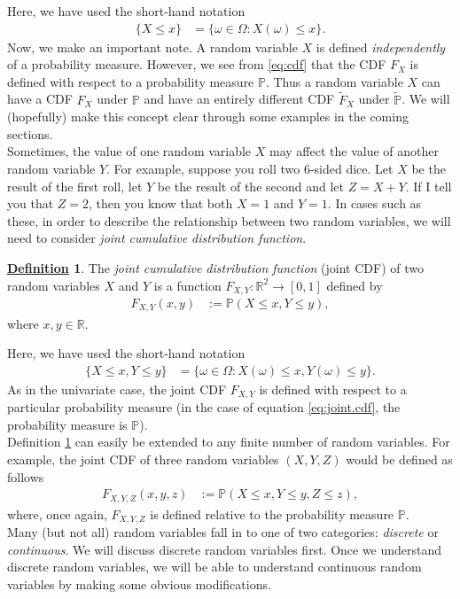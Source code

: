 \documentclass[12pt]{book}
\numberwithin{equation}{chapter}
\theoremstyle{plain}
\numberwithin{theorem}{section}
\theoremstyle{definition}
\newtheorem{definition}[theorem]{\underline{Definition}}
\numberwithin{exercise}{chapter}
\newcommand{\<}{\langle}
\renewcommand{\>}{\rangle}
\renewcommand{\(}{\left(}
\renewcommand{\)}{\right)}
\renewcommand{\[}{\left[}
\renewcommand{\]}{\right]}
\newcommand\Pb{\mathds{P}}
\newcommand\Rb{\mathds{R}}
\newcommand\om{\omega}
\newcommand\Om{\Omega}
\newcommand\Pbt{\widetilde{\Pb}}
\newcommand\Ft{\widetilde{F}}
\theoremstyle{definition}
\numberwithin{question}{section}
\begin{document}
\noindent
Here, we have used the short-hand notation
\begin{align}
\{ X \leq x \}
	&=	\{ \om \in \Om : X(\om) \leq x \} .
\end{align}
Now, we make an important note.  A random variable $X$ is defined \textit{independently} of a probability measure.  However, we see from \eqref{eq:cdf} that the CDF $F_X$ is defined with respect to a probability measure $\Pb$.  Thus a random variable $X$ can have a CDF $F_X$ under $\Pb$ and have an entirely different CDF $\Ft_X$ under $\Pbt$.  We will (hopefully) make this concept clear through some examples in the coming sections.
\\[0.5em]
Sometimes, the value of one random variable $X$ may affect the value of another random variable $Y$.  
For example, suppose you roll two 6-sided dice.  Let $X$ be the result of the first roll, let $Y$ be the result of the second and let $Z = X+Y$.  If I tell you that $Z = 2$, then you know that both $X = 1$ and $Y = 1$.
In cases such as these, in order to describe the relationship between two random variables, we will need to consider \textit{joint cumulative distribution function}.

\begin{definition}
\label{def:joint.cdf}
The \textit{joint cumulative distribution function} (joint CDF) of two random variables $X$ and $Y$ is a function $F_{X,Y} : \Rb^2 \to [0,1]$ defined by
\begin{align}
F_{X,Y}(x,y)
	&:= \Pb( X \leq x, Y \leq y ) , \label{eq:joint.cdf}
\end{align}
where $x,y \in \Rb$.
\end{definition}

\noindent
Here, we have used the short-hand notation
\begin{align}
\{ X \leq x , Y \leq y\}
	&=	\{ \om \in \Om : X(\om) \leq x, Y(\om) \leq y \} .
\end{align}
As in the univariate case, the joint CDF $F_{X,Y}$ is defined with respect to a particular probability measure (in the case of equation \eqref{eq:joint.cdf}, the probability measure is $\Pb$).
\\[0.5em]
Definition \ref{def:joint.cdf} can easily be extended to any finite number of random variables.  For example, the joint CDF of three random variables $(X,Y,Z)$ would be defined as follows
\begin{align}
F_{X,Y,Z}(x,y,z) 
	&:= \Pb( X \leq x, Y \leq y, Z \leq z) ,
\end{align}
where, once again, $F_{X,Y,Z}$ is defined relative to the probability measure $\Pb$.
\\[0.5em]
Many (but not all) random variables fall in to one of two categories: \textit{discrete} or \textit{continuous}.  
We will discuss discrete random variables first.  Once we understand discrete random variables, we will be able to understand continuous random variables by making some obvious modifications.
\end{document}
